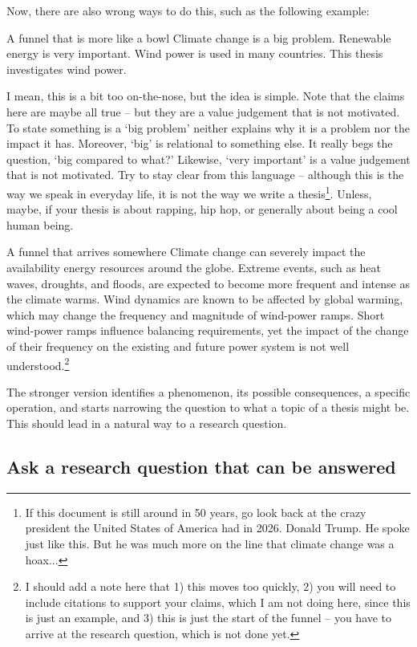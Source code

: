 \documentclass[masters,en,listoffigures,listoftables,acronyms]{NMBU}
\begin{document}
Now, there are also wrong ways to do this, such as the following example:
\begin{avoidbox}{A funnel that is more like a bowl}
Climate change is a big problem. Renewable energy is very important. Wind power is used in many countries. This thesis investigates wind power.
\end{avoidbox}
I mean, this is a bit too on-the-nose, but the idea is simple.
Note that the claims here are maybe all true -- but they are a value judgement that is not motivated.
To state something is a `big problem' neither explains why it is a problem nor the impact it has.
Moreover, `big' is relational to something else.
It really begs the question, `big compared to what?' Likewise, `very important' is a value judgement that is not motivated.
Try to stay clear from this language -- although this is the way we speak in everyday life, it is not the way we write a thesis\footnote{If this document is still around in 50 years, go look back at the crazy president the United States of America had in 2026. Donald Trump. He spoke just like this. But he was much more on the line that climate change was a hoax...}.
Unless, maybe, if your thesis is about rapping, hip hop, or generally about being a cool human being.


\begin{betterbox}{A funnel that arrives somewhere}
Climate change can severely impact the availability energy resources around the globe.
Extreme events, such as heat waves, droughts, and floods, are expected to become more frequent and intense as the climate warms.
Wind dynamics are known to be affected by global warming, which may change the frequency and magnitude of wind-power ramps.
Short wind-power ramps influence balancing requirements, yet the impact of the change of their frequency on the existing and future power system is not well understood.\footnote{I should add a note here that 1) this moves too quickly, 2) you will need to include citations to support your claims, which I am not doing here, since this is just an example, and 3) this is just the start of the funnel -- you have to arrive at the research question, which is not done yet.}
\end{betterbox}

The stronger version identifies a phenomenon, its possible consequences, a specific operation, and starts narrowing the question to what a topic of a thesis might be.
This should lead in a natural way to a research question.

\subsection{Ask a research question that can be answered}
\end{document}
